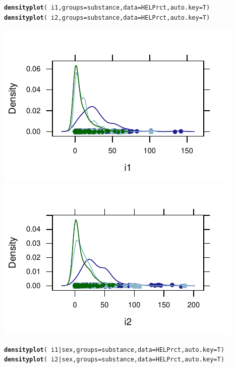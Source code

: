 \documentclass[twoside]{book}\usepackage[]{graphicx}\usepackage[]{xcolor}
\makeatletter
\def\maxwidth{ %
  \ifdim\Gin@nat@width>\linewidth
    \linewidth
  \else
    \Gin@nat@width
  \fi
}
\newcommand{\hlopt}[1]{\textcolor[rgb]{0,0,0}{#1}}%
\newcommand{\hlstd}[1]{\textcolor[rgb]{0.345,0.345,0.345}{#1}}%
\newcommand{\hlkwc}[1]{\textcolor[rgb]{0.333,0.667,0.333}{#1}}%
\newcommand{\hlkwd}[1]{\textcolor[rgb]{0.737,0.353,0.396}{\textbf{#1}}}%
\newenvironment{kframe}{%
 \def\at@end@of@kframe{}%
 \ifinner\ifhmode%
  \def\at@end@of@kframe{\end{minipage}}%
  \begin{minipage}{\columnwidth}%
 \fi\fi%
 \def\FrameCommand##1{\hskip\@totalleftmargin \hskip-\fboxsep
 \colorbox{shadecolor}{##1}\hskip-\fboxsep
     \hskip-\linewidth \hskip-\@totalleftmargin \hskip\columnwidth}%
 \MakeFramed {\advance\hsize-\width
   \@totalleftmargin\z@ \linewidth\hsize
   \@setminipage}}%
 {\par\unskip\endMakeFramed%
 \at@end@of@kframe}
\newenvironment{knitrout}{}{} %
\makeatother
\begin{document}
\begin{solution}
\begin{knitrout}
\color{fgcolor}\begin{kframe}
\begin{alltt}
\hlkwd{densityplot}\hlstd{(}\hlopt{~}\hlstd{i1,} \hlkwc{groups} \hlstd{= substance,} \hlkwc{data} \hlstd{= HELPrct,} \hlkwc{auto.key} \hlstd{= T)}
\hlkwd{densityplot}\hlstd{(}\hlopt{~}\hlstd{i2,} \hlkwc{groups} \hlstd{= substance,} \hlkwc{data} \hlstd{= HELPrct,} \hlkwc{auto.key} \hlstd{= T)}
\end{alltt}
\end{kframe}

{\centering \includegraphics[width=\maxwidth]{figures/fig-unnamed-chunk-36-1} 
\includegraphics[width=\maxwidth]{figures/fig-unnamed-chunk-36-2} 

}



\end{knitrout}
\begin{knitrout}
\color{fgcolor}\begin{kframe}
\begin{alltt}
\hlkwd{densityplot}\hlstd{(}\hlopt{~}\hlstd{i1} \hlopt{|} \hlstd{sex,} \hlkwc{groups} \hlstd{= substance,} \hlkwc{data} \hlstd{= HELPrct,} \hlkwc{auto.key} \hlstd{= T)}
\hlkwd{densityplot}\hlstd{(}\hlopt{~}\hlstd{i2} \hlopt{|} \hlstd{sex,} \hlkwc{groups} \hlstd{= substance,} \hlkwc{data} \hlstd{= HELPrct,} \hlkwc{auto.key} \hlstd{= T)}
\end{alltt}
\end{kframe}


\end{knitrout}
\end{solution}
\end{document}
